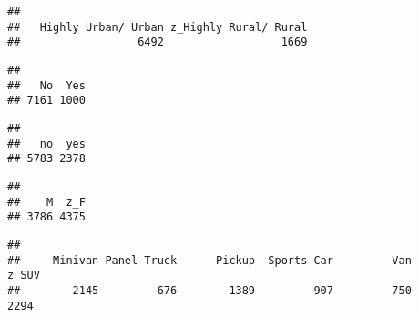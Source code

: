 \documentclass[
]{article}
\newenvironment{Shaded}{\begin{snugshade}}{\end{snugshade}}
\newcommand{\CommentTok}[1]{\textcolor[rgb]{0.56,0.35,0.01}{\textit{#1}}}
\newcommand{\FunctionTok}[1]{\textcolor[rgb]{0.13,0.29,0.53}{\textbf{#1}}}
\newcommand{\NormalTok}[1]{#1}
\newcommand{\SpecialCharTok}[1]{\textcolor[rgb]{0.81,0.36,0.00}{\textbf{#1}}}
\begin{document}
\begin{verbatim}
## 
##   Highly Urban/ Urban z_Highly Rural/ Rural 
##                  6492                  1669
\end{verbatim}

\begin{Shaded}
\end{Shaded}

\begin{verbatim}
## 
##   No  Yes 
## 7161 1000
\end{verbatim}

\begin{Shaded}
\end{Shaded}

\begin{verbatim}
## 
##   no  yes 
## 5783 2378
\end{verbatim}

\begin{Shaded}
\end{Shaded}

\begin{verbatim}
## 
##    M  z_F 
## 3786 4375
\end{verbatim}

\begin{Shaded}
\end{Shaded}

\begin{verbatim}
## 
##     Minivan Panel Truck      Pickup  Sports Car         Van       z_SUV 
##        2145         676        1389         907         750        2294
\end{verbatim}

\begin{Shaded}
\end{Shaded}
\end{document}
